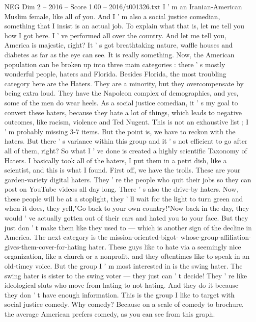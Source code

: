 \begin{textsample}{NEG Dim 2 – 2016 – Score 1.00 – 2016/t001326.txt}  \label{ex:f2_neg_053}
I ' m an Iranian-American Muslim female, like all of you.
And I ' m also a social justice comedian, something that I insist is an actual job.
To explain what that is, let me tell you how I got here.
I ' ve performed all over the country.
And let me tell you, America is majestic, right?
It ' s got breathtaking nature, waffle houses and diabetes as far as the eye can see.
It is really something.
Now, the American population can be broken up into three main categories : there ' s mostly wonderful people, haters and Florida.
Besides Florida, the most troubling category here are the Haters.
They are a minority, but they overcompensate by being extra loud.
They have the Napoleon complex of demographics, and yes, some of the men do wear heels.
As a social justice comedian, it ' s my goal to convert these haters, because they hate a lot of things, which leads to negative outcomes, like racism, violence and Ted Nugent.
This is not an exhaustive list ; I ' m probably missing 3-7 items.
But the point is, we have to reckon with the haters.
But there ' s variance within this group and it ' s not efficient to go after all of them, right?
So what I ' ve done is created a highly scientific Taxonomy of Haters.
I basically took all of the haters, I put them in a petri dish, like a scientist, and this is what I found.
First off, we have the trolls.
These are your garden-variety digital haters.
They ' re the people who quit their jobs so they can post on YouTube videos all day long.
There ' s also the drive-by haters.
Now, these people will be at a stoplight, they ' ll wait for the light to turn green and when it does, they yell,"Go back to your own country!"Now back in the day, they would ' ve actually gotten out of their cars and hated you to your face.
But they just don ' t make them like they used to — which is another sign of the decline in America.
The next category is the mission-oriented-bigot- whose-group-affiliation- gives-them-cover-for-hating hater.
These guys like to hate via a seemingly nice organization, like a church or a nonprofit, and they oftentimes like to speak in an old-timey voice.
But the group I ' m most interested in is the swing hater.
The swing hater is sister to the swing voter — they just can ' t decide!
They ' re like ideological sluts who move from hating to not hating.
And they do it because they don ' t have enough information.
This is the group I like to target with social justice comedy.
Why comedy?
Because on a scale of comedy to brochure, the average American prefers comedy, as you can see from this graph.

\end{textsample}
